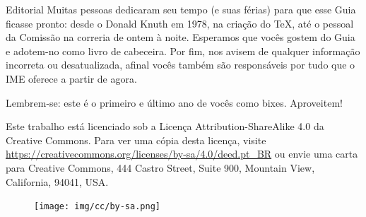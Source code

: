 \begin{editorial}{Editorial}
Muitas pessoas dedicaram seu tempo (e suas férias) para que esse Guia ficasse
pronto: desde o Donald Knuth em 1978, na criação do \TeX\makebox{}, até o
pessoal da Comissão na correria de ontem à noite. Esperamos que vocês gostem do Guia
e adotem-no como livro de cabeceira. Por fim, nos avisem de qualquer informação
incorreta ou desatualizada, afinal vocês também são responsáveis por tudo que o
IME oferece a partir de agora.

Lembrem-se: este é o primeiro e último ano de vocês como bixes. Aproveitem!


Este trabalho está licenciado sob a Licença Attribution-ShareAlike 4.0 da
Creative Commons. Para ver uma cópia desta licença, visite
\url{https://creativecommons.org/licenses/by-sa/4.0/deed.pt_BR} ou envie
uma carta para Creative Commons, 444 Castro Street, Suite 900, Mountain View,
California, 94041, USA.
\\
\begin{figure}[H]
    \centering
    \texttt{[image: img/cc/by-sa.png]}
\end{figure}

\end{editorial}
